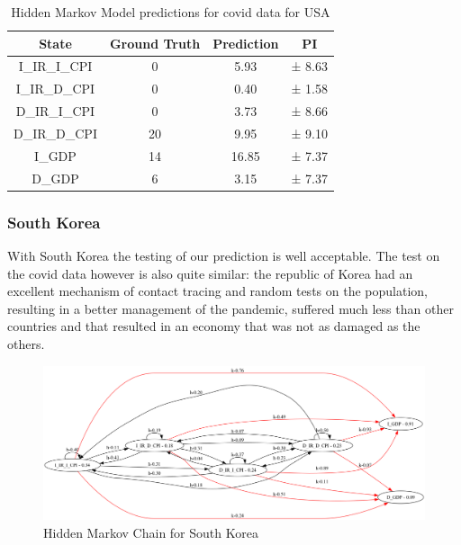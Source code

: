 \begin{table}[H]
  \centering
  \begin{tabular}{|c|c|c|c|}
    \hline
    State         & Ground Truth & Prediction & PI     \\
    \hline
    I\_IR\_I\_CPI & 0            & 5.93       & ± 8.63 \\
    I\_IR\_D\_CPI & 0            & 0.40       & ± 1.58 \\
    D\_IR\_I\_CPI & 0            & 3.73       & ± 8.66 \\
    D\_IR\_D\_CPI & 20           & 9.95       & ± 9.10 \\
    I\_GDP        & 14           & 16.85      & ± 7.37 \\
    D\_GDP        & 6            & 3.15       & ± 7.37 \\
    \hline
  \end{tabular}
  \label{tab:usa_covid}
  \caption{Hidden Markov Model predictions for covid data for USA}
\end{table}

\subsubsection*{South Korea}
With South Korea the testing of our prediction is well acceptable. The test on the covid data however is also quite similar: the republic of Korea had an excellent mechanism of contact tracing and random tests on the population, resulting in a better management of the pandemic, suffered much less than other countries and that resulted in an economy that was not as damaged as the others.

\begin{figure}[H]
    \centering
    \includegraphics[width=\linewidth]{imgs/sk_hmm.png}
    \caption{Hidden Markov Chain for South Korea}
    \label{fig:correlation_sk}
\end{figure}

